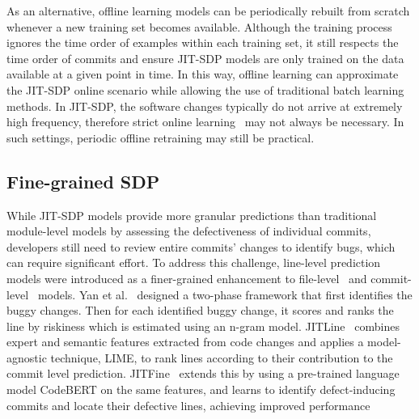 \documentclass[\main/thesis.tex]{subfiles}
\begin{document}
As an alternative, offline learning models can be periodically rebuilt from scratch whenever a new training set becomes available. Although the training process ignores the time order of examples within each training set, it still respects the time order of commits and ensure JIT-SDP models are only trained on the data available at a given point in time. In this way, offline learning can approximate the JIT-SDP online scenario while allowing the use of traditional batch learning methods. In JIT-SDP, the software changes typically do not arrive at extremely high frequency, therefore strict online learning~\cite{cabral2023investigation} may not always be necessary. In such settings, periodic offline retraining may still be practical.


\subsection{Fine-grained SDP}
While JIT-SDP models provide more granular predictions than traditional module-level models by assessing the defectiveness of individual commits, developers still need to review entire commits' changes to identify bugs, which can require significant effort. To address this challenge, line-level prediction models were introduced as a finer-grained enhancement to file-level~\cite{wattanakriengkrai2020predicting} and commit-level~\cite{yan2020JIT, pornprasit2021jitline} models. Yan et al.~\cite{yan2020JIT} designed a two-phase framework that first identifies the buggy changes. Then for each identified buggy change, it scores and ranks the line by riskiness which is estimated using an n-gram model. 
JITLine~\cite{pornprasit2021jitline} combines expert and semantic features extracted from code changes and applies a model-agnostic technique, LIME, to rank lines according to their contribution to the commit level prediction. JITFine~\cite{jitfine} extends this by using a pre-trained language model CodeBERT on the same features, and learns to identify defect‑inducing commits and locate their defective lines, achieving improved performance
\end{document}
